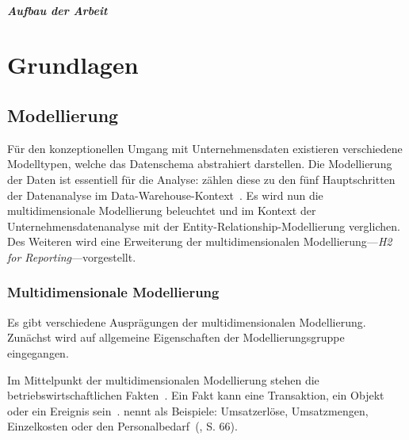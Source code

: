 \documentclass[
  language=german, %
  type=bachelor%
]{isthesis}
\begin{document}
\begin{content}
  \paragraph{Aufbau der Arbeit}




  \chapter{Grundlagen}
  


  \section{Modellierung}

  Für den konzeptionellen Umgang mit Unternehmensdaten existieren verschiedene
  Modelltypen, welche das Datenschema abstrahiert darstellen.
  Die Modellierung der Daten ist essentiell für die Analyse:
  \textsc{\citeauthor{phipps2002automating}} zählen diese
  zu den fünf Hauptschritten der Datenanalyse im
  Data-Warehouse-Kontext~\cite[][S. 1]{phipps2002automating}. Es wird nun
  die multidimensionale Modellierung beleuchtet und im Kontext der Unternehmensdatenanalyse
  mit der Entity-Relationship-Modellierung verglichen. Des Weiteren wird
  eine Erweiterung der multidimensionalen Modellierung---\textit{H2 for
  Reporting}---vorgestellt.



  \subsection{Multidimensionale Modellierung}
  Es gibt verschiedene Ausprägungen der multidimensionalen Modellierung.
  Zunächst wird auf allgemeine Eigenschaften der Modellierungsgruppe eingegangen.

  Im Mittelpunkt der multidimensionalen Modellierung stehen die
  betriebswirtschaftlichen Fakten~\cite[][S.  2]{phipps2002automating}. Ein
  Fakt kann eine Transaktion, ein Objekt oder ein Ereignis sein~\cite[][S.
  42]{ballard1998data}. \textsc{\citeauthor{Kemper2010}} nennt als Beispiele:
  \glqq{}Umsatzerlöse, Umsatzmengen, Einzelkosten oder den
  Personalbedarf\grqq{}~(\citeyear{Kemper2010}, S. 66). 
  

\end{content}
\end{document}
